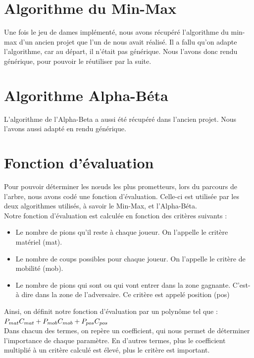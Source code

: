 \documentclass[a4paper, title page, 12pt]{report}
\begin{document}
	\newpage
		
	\section{Algorithme du Min-Max}
	Une fois le jeu de dames implémenté, nous avons récupéré l'algorithme du min-max d'un ancien projet que l'un de nous avait réalisé. Il a fallu qu'on adapte l'algorithme, car au départ, il n'était pas générique. Nous l'avons donc rendu générique, pour pouvoir le réutiliser par la suite.\\
	
	\section{Algorithme Alpha-Béta}
	L'algorithme de l'Alpha-Beta a aussi été récupéré dans l'ancien projet. Nous l'avons aussi adapté en rendu générique.\\
	
		\section{Fonction d'évaluation}
	Pour pouvoir déterminer les nœuds les plus prometteurs, lors du parcours de l'arbre, nous avons codé une fonction d'évaluation. Celle-ci est utilisée par les deux algorithmes utilisés, à savoir le Min-Max, et l'Alpha-Béta.\\
	
	Notre fonction d'évaluation est calculée en fonction des critères suivants : 

	\begin{itemize}
		\item Le nombre de pions qu'il reste à chaque joueur. On l'appelle le critère matériel (mat).
		
		\item Le nombre de coups possibles pour chaque joueur. On l'appelle le critère de mobilité (mob). 
		
		\item Le nombre de pions qui sont ou qui vont entrer dans la zone gagnante. C'est-à dire dans la zone de l'adversaire. Ce critère est appelé position (pos)\\
\end{itemize}
	
  Ainsi, on définit notre fonction d'évaluation par un polynôme tel que :\\
	
	
	
	\begin{math}
 P_{mat}C_{mat} + P_{mob}C_{mob} + P_{pos}C_{pos}\\ 
	\end{math}
	\\
	Dans chacun des termes, on repère un coefficient, qui nous permet de déterminer l'importance de chaque paramètre. En d'autres termes, plus le coefficient multiplié à un critère calculé est élevé, plus le critère est important.
	
\end{document}
